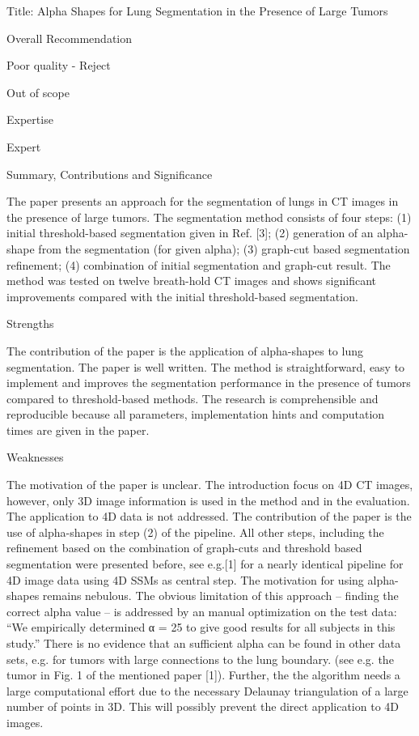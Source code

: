 Title: Alpha Shapes for Lung Segmentation in the Presence of Large Tumors


Overall Recommendation

   Poor quality - Reject

Out of scope


Expertise

   Expert

Summary, Contributions and Significance

   The paper presents an approach for the segmentation of lungs in CT images
   in the presence of large tumors. The segmentation method consists of four
   steps: (1) initial threshold-based segmentation given in Ref. [3]; (2)
   generation of an alpha-shape from the segmentation (for given alpha); (3)
   graph-cut based segmentation refinement; (4) combination of initial
   segmentation and graph-cut result.
   The method was tested on twelve breath-hold CT images and shows
   significant improvements compared with the initial threshold-based
   segmentation.

Strengths

   The contribution of the paper is the application of alpha-shapes to lung
   segmentation.
   The paper is well written. The method is straightforward, easy to
   implement and improves the segmentation performance in the presence of
   tumors compared to threshold-based methods. The research is
   comprehensible and reproducible because all parameters, implementation
   hints and computation times are given in the paper.

Weaknesses

   The motivation of the paper is unclear. The introduction focus on 4D CT
   images, however, only 3D image information is used in the method and in
   the evaluation. The application to 4D data is not addressed.
   The contribution of the paper is the use of alpha-shapes in step (2) of
   the pipeline. All other steps, including the refinement based on the
   combination of graph-cuts and threshold based segmentation were presented
   before, see e.g.[1] for a nearly identical pipeline for 4D image data
   using 4D SSMs as central step.
   The motivation for using alpha-shapes remains nebulous. The obvious
   limitation of this approach -- finding the correct alpha value -- is
   addressed by an manual optimization on the test data: “We empirically
   determined α = 25 to give good results for all subjects in this
   study.”
   There is no evidence that an sufficient alpha can be found in other data
   sets, e.g. for tumors with large connections to the lung boundary. (see
   e.g. the tumor in Fig. 1 of the mentioned paper [1]).
   Further, the the algorithm needs a large computational effort due to the
   necessary Delaunay triangulation of a large number of points in 3D. This
   will possibly prevent the direct application to 4D images.

